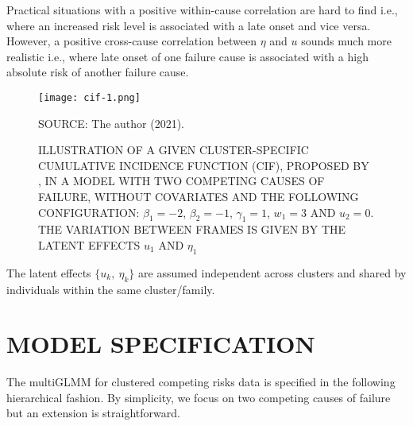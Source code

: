 Practical situations with a positive within-cause correlation are hard
to find i.e., where an increased risk level is associated with a late
onset and vice versa. However, a positive cross-cause correlation
between \(\eta\) and \(u\) sounds much more realistic i.e., where late
onset of one failure cause is associated with a high absolute risk of
another failure cause.

\begin{figure}[H]
 \setlength{\abovecaptionskip}{.0001pt}
 \caption{ILLUSTRATION OF A GIVEN CLUSTER-SPECIFIC CUMULATIVE INCIDENCE
          FUNCTION (CIF), PROPOSED BY , IN A MODEL
          WITH TWO COMPETING CAUSES OF FAILURE, WITHOUT COVARIATES AND
          THE FOLLOWING CONFIGURATION: \(\beta_{1} = -2\),
          \(\beta_{2} = -1\), \(\gamma_{1} = 1\), \(w_{1} = 3\) AND
          \(u_{2} = 0\). THE VARIATION BETWEEN FRAMES IS GIVEN BY THE
          LATENT EFFECTS \(u_{1}\) AND \(\eta_{1}\)}
 \vspace{0.2cm}\centering
 \texttt{[image: cif-1.png]}\\
 \begin{footnotesize}
  SOURCE: The author (2021).
 \end{footnotesize}
 \label{fig:cif}
\end{figure}

The latent effects \(\{u_{k},~\eta_{k}\}\) are assumed independent
across clusters and shared by individuals within the same
cluster/family.

\section{MODEL SPECIFICATION}
\label{cap:modelitself}

The multiGLMM for clustered competing risks data is specified in the
following hierarchical fashion. By simplicity, we focus on two competing
causes of failure but an extension is straightforward.

